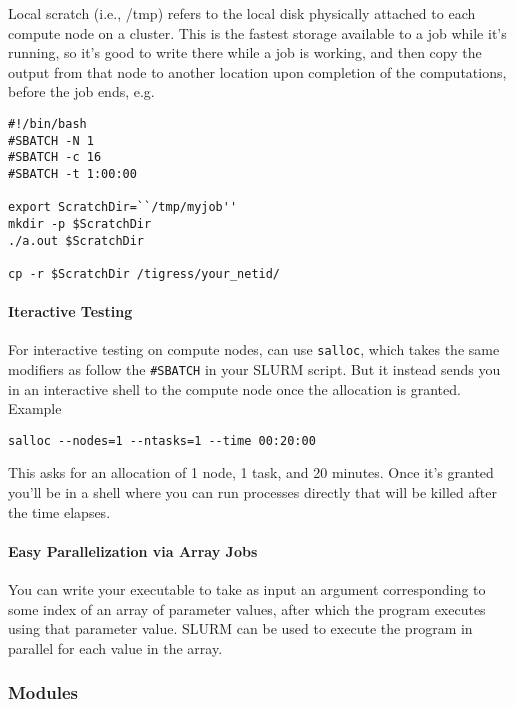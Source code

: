 \documentclass[12pt]{article}
\theoremstyle{plain}
\theoremstyle{definition}
\theoremstyle{remark}
\begin{document}
Local scratch (i.e., /tmp) refers to the local disk physically attached
to each compute node on a cluster. This is the fastest storage available
to a job while it's running, so it's good to write there while a job is
working, and then copy the output from that node to another location
upon completion of the computations, before the job ends, e.g.
\begin{lstlisting}
#!/bin/bash
#SBATCH -N 1
#SBATCH -c 16
#SBATCH -t 1:00:00

export ScratchDir=``/tmp/myjob''
mkdir -p $ScratchDir
./a.out $ScratchDir

cp -r $ScratchDir /tigress/your_netid/
\end{lstlisting}


\paragraph{Iteractive Testing}
For interactive testing on compute nodes, can use \texttt{salloc}, which
takes the same modifiers as follow the \texttt{\#SBATCH} in your SLURM
script. But it instead sends you in an interactive shell to the compute
node once the allocation is granted.
Example
\begin{lstlisting}
salloc --nodes=1 --ntasks=1 --time 00:20:00
\end{lstlisting}
This asks for an allocation of 1 node, 1 task, and 20 minutes. Once it's
granted you'll be in a shell where you can run processes directly that
will be killed after the time elapses.


\paragraph{Easy Parallelization via Array Jobs}
You can write your executable to take as input an argument corresponding
to some index of an array of parameter values, after which the program
executes using that parameter value.
SLURM can be used to execute the program in parallel for each value in
the array.



\clearpage
\subsubsection{Modules}
\end{document}
